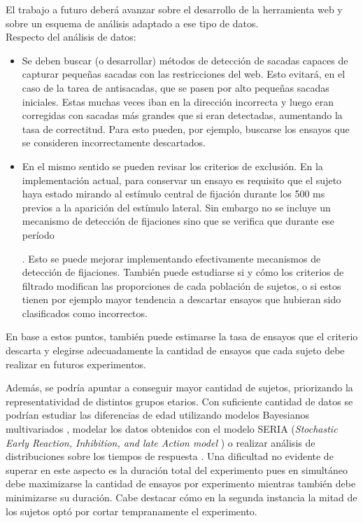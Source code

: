 El trabajo a futuro deberá avanzar sobre el desarrollo de la herramienta web y
sobre un esquema de análisis adaptado a ese tipo de datos. \\
Respecto del análisis de datos: 
\begin{itemize}
  \item Se deben buscar (o desarrollar) métodos de detección de sacadas capaces
de capturar pequeñas sacadas con las restricciones del \eyetracking web.
  Esto evitará, en el caso de la tarea de antisacadas, que se pasen por alto
pequeñas sacadas iniciales.
  Estas muchas veces iban en la dirección incorrecta y luego eran corregidas
con sacadas más grandes que si eran detectadas, aumentando la tasa de
correctitud.
  Para esto pueden, por ejemplo, buscarse los ensayos que se consideren
incorrectamente descartados. 

  \item En el mismo sentido se pueden revisar los criterios de exclusión.
  En la implementación actual, para conservar un ensayo es requisito que el
sujeto haya estado mirando al estímulo central de fijación durante los 500 ms
previos a la aparición del estímulo lateral.
  Sin embargo no se incluye un mecanismo de detección de fijaciones sino que se
verifica que durante ese período .
  Esto se puede mejorar implementando efectivamente mecanismos de detección de
fijaciones.
  También puede estudiarse si y cómo los criterios de filtrado modifican las
proporciones de cada población de sujetos, o si estos tienen por ejemplo mayor
tendencia a descartar ensayos que hubieran sido clasificados como incorrectos.
\end{itemize}

En base a estos puntos, también puede estimarse la tasa de ensayos que el
criterio descarta y elegirse adecuadamente la cantidad de ensayos que cada
sujeto debe realizar en futuros experimentos.

Además, se podría apuntar a conseguir mayor cantidad de sujetos, priorizando la
representatividad de distintos grupos etarios.
Con suficiente cantidad de datos se podrían estudiar las diferencias de edad
utilizando modelos Bayesianos multivariados
\cite{plomecka_2020_retest_reliability}, modelar los datos obtenidos con el
modelo SERIA (\textit{Stochastic Early Reaction, Inhibition, and late Action
model} \cite{aponte_2017_seria}) o realizar análisis de distribuciones sobre
los tiempos de respuesta \cite{unsworth_2011_distribution_analysis}.
Una dificultad no evidente de superar en este aspecto es la duración total del
experimento pues en simultáneo debe maximizarse la cantidad de ensayos por
experimento mientras también debe minimizarse su duración.
Cabe destacar cómo en la segunda instancia la mitad de los sujetos optó por
cortar tempranamente el experimento.


